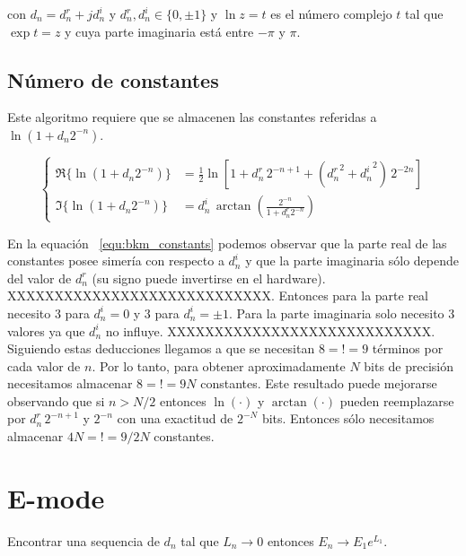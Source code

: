 \documentclass[10pt,a4paper]{book}
\begin{document}
   con $d_n = d_n^r + j d_n^i $ y $d_n^r, d_n^i \in \{ 0, \pm 1 \}$ y $\ln z = t$ es el número complejo $t$ tal que $\exp{t} = z$ y cuya parte imaginaria está entre $-\pi$ y $\pi$.


   \subsection{N\'umero de constantes}

   Este algoritmo requiere que se almacenen las constantes referidas a $\ln(1 + d_n 2^{-n})$.

   \begin{equation} \label{eq:bkm_constants}
      \left\{
         \begin{aligned}
            \Re \{\ln(1 + d_n 2^{-n})\} &= \frac{1}{2} \ln[ 1 + d_n^r \, 2^{-n+1} + ({d_n^r}^2 + {d_n^i}^2) \, 2^{-2n} ] \\
            \Im \{\ln(1 + d_n 2^{-n})\} &= d_n^i \, \arctan{ \left( \frac{2^{-n}}{1+d_n^r 2^{-n}} \right) }
         \end{aligned}
      \right.
   \end{equation}

   En la equaci\'on ~\ref{equ:bkm_constants} podemos observar que la parte real de las constantes posee simer\'ia con respecto a $d_n^i$ y que la parte imaginaria s\'olo depende del valor de $d_n^r$ (su signo puede invertirse en el hardware).
   XXXXXXXXXXXXXXXXXXXXXXXXXXXX.
   Entonces para la parte real necesito 3 para $d_n^i=0$ y 3 para $d_n^i=\pm 1$.
   Para la parte imaginaria solo necesito 3 valores ya que $d_n^i$ no influye.
   XXXXXXXXXXXXXXXXXXXXXXXXXXXX.
   Siguiendo estas deducciones llegamos a que se necesitan $8 =!= 9$ t\'erminos por cada valor de $n$. Por lo tanto, para obtener aproximadamente $N$ bits de precisi\'on necesitamos almacenar $8=!=9 N$ constantes. Este resultado puede mejorarse observando que si $n > N/2$ entonces $\ln(\cdot)$ y $\arctan(\cdot)$ pueden reemplazarse por $ d_n^r \, 2^{-n+1}$ y $2^{-n}$ con una exactitud de $2^{-N}$ bits.
   Entonces s\'olo necesitamos almacenar $4 N =!= 9/2 N$ constantes.



\section{E-mode}

   Encontrar una sequencia de $d_n$ tal que $L_n \rightarrow 0$ entonces $E_n \rightarrow E_1 e^{L_1}$.
\end{document}
